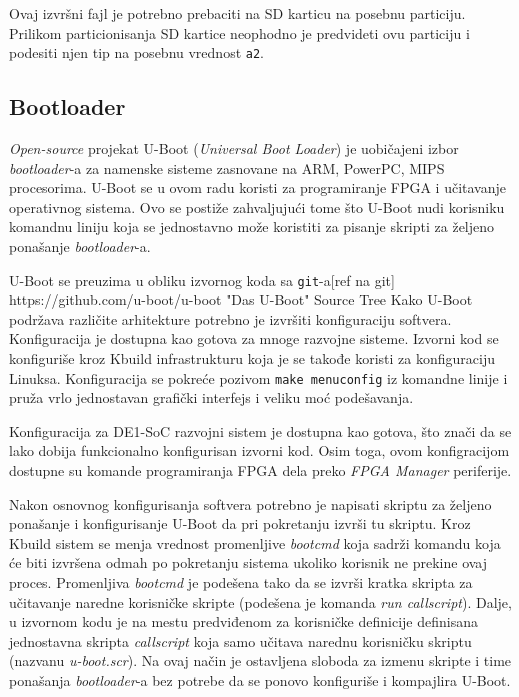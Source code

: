 Ovaj izvršni fajl je potrebno prebaciti na SD karticu na posebnu particiju. Prilikom particionisanja SD kartice neophodno je predvideti ovu particiju i podesiti njen tip na posebnu vrednost \texttt{a2}.

\subsection{Bootloader}
\textit{Open-source} projekat U-Boot (\textit{Universal Boot Loader}) je uobičajeni izbor \textit{bootloader}-a za namenske sisteme zasnovane na ARM, PowerPC, MIPS procesorima. U-Boot se u ovom radu koristi za programiranje FPGA i učitavanje operativnog sistema. Ovo se postiže zahvaljujući tome što U-Boot nudi korisniku komandnu liniju koja se jednostavno može koristiti za pisanje skripti za željeno ponašanje \textit{bootloader}-a.

U-Boot se preuzima u obliku izvornog koda sa \texttt{git}-a[ref na git]
https://github.com/u-boot/u-boot
"Das U-Boot" Source Tree
Kako U-Boot podržava različite arhitekture potrebno je izvršiti konfiguraciju softvera. Konfiguracija je dostupna kao gotova za mnoge razvojne sisteme. Izvorni kod se konfiguriše kroz Kbuild infrastrukturu koja je se takođe koristi za konfiguraciju Linuksa. Konfiguracija se pokreće pozivom \texttt{make menuconfig} iz komandne linije i pruža vrlo jednostavan grafički interfejs i veliku moć podešavanja.

Konfiguracija za DE1-SoC razvojni sistem je dostupna kao gotova, što znači da se lako dobija funkcionalno konfigurisan izvorni kod. Osim toga, ovom konfigracijom dostupne su komande programiranja FPGA dela preko \textit{FPGA Manager} periferije.

Nakon osnovnog konfigurisanja softvera potrebno je napisati skriptu za željeno ponašanje i konfigurisanje U-Boot da pri pokretanju izvrši tu skriptu. Kroz Kbuild sistem se menja vrednost promenljive \textit{bootcmd} koja sadrži komandu koja će biti izvršena odmah po pokretanju sistema ukoliko korisnik ne prekine ovaj proces. Promenljiva \textit{bootcmd} je podešena tako da se izvrši kratka skripta za učitavanje naredne korisničke skripte (podešena je komanda \textit{run callscript}). Dalje, u izvornom kodu je na mestu predviđenom za korisničke definicije definisana jednostavna skripta \textit{callscript} koja samo učitava narednu korisničku skriptu (nazvanu \textit{u-boot.scr}). Na ovaj način je ostavljena sloboda za izmenu skripte i time ponašanja \textit{bootloader}-a bez potrebe da se ponovo konfiguriše i kompajlira U-Boot.

